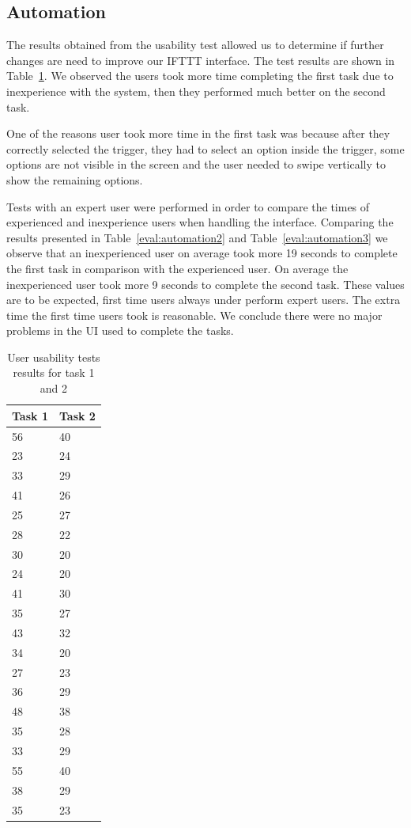 \subsection{Automation}

The results obtained from the usability test allowed us to determine if further changes are need to improve our \ac{IFTTT} interface. The test results are shown in  Table~\ref{eval:automation1}. We observed the users took more time completing the first task due to inexperience with the system, then they performed much better on the second task. 

One of the reasons user took more time in the first task was because after they correctly selected the trigger, they had to select an option inside the trigger, some options are not visible in the screen and the user needed to swipe vertically to show the remaining options.

Tests with an expert user were performed in order to compare the times of experienced and inexperience users when handling the interface. Comparing the results presented in Table~\ref{eval:automation2} and Table~\ref{eval:automation3} we observe that an inexperienced user on average took more 19 seconds to complete the first task in comparison with the experienced user. On average the inexperienced user took more 9 seconds to complete the second task. These values are to be expected, first time users always under perform expert users. The extra time the first time users took is reasonable. We conclude there were no major problems in the \ac{UI} used to complete the tasks.

 


\begin{table}[]
\centering
\begin{tabular}{|l|l|}
\hline
Task 1 & Task 2 \\ \hline
56 & 40 \\ \hline
23 & 24 \\ \hline
33 & 29 \\ \hline
41 & 26 \\ \hline
25 & 27 \\ \hline
28 & 22 \\ \hline
30 & 20 \\ \hline
24 & 20 \\ \hline
41 & 30 \\ \hline
35 & 27 \\ \hline
43 & 32 \\ \hline
34 & 20 \\ \hline
27 & 23 \\ \hline
36 & 29 \\ \hline
48 & 38 \\ \hline
35 & 28 \\ \hline
33 & 29 \\ \hline
55 & 40 \\ \hline
38 & 29 \\ \hline
35 & 23 \\ \hline
\end{tabular}
\caption{User usability tests results for task 1 and 2}
\label{eval:automation1}
\end{table}

